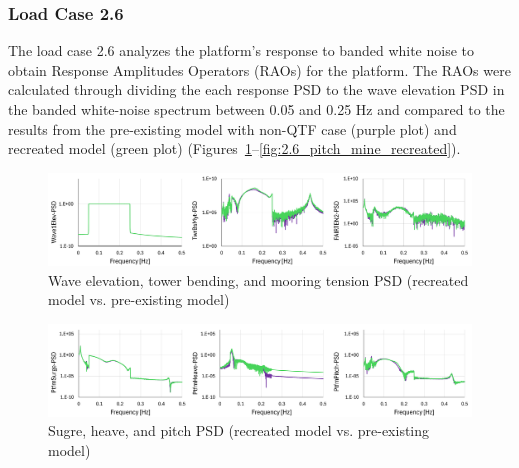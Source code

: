 \documentclass[a4paper, 11pt]{article}
\begin{document}
\subsubsection{Load Case 2.6}

\hspace*{0.5cm}The load case 2.6 analyzes the platform's response to banded white noise to obtain Response Amplitudes Operators (RAOs) for the platform. The RAOs were calculated through dividing the each response PSD to the wave elevation PSD in the banded white-noise spectrum between 0.05 and 0.25 Hz and compared to the results from the pre-existing model with non-QTF case (purple plot) and recreated model (green plot) (Figures~\ref{fig:w_t_t_p_mine_recreated}--\ref{fig:2.6_pitch_mine_recreated}).

\begin{figure}[H]
    \centering
    \includegraphics[width=1\textwidth]{wave_twr_ten_psd_mine.png}
    \caption{\small Wave elevation, tower bending, and mooring tension PSD (recreated model vs. pre-existing model)}
    \label{fig:w_t_t_p_mine_recreated}
\end{figure}

\begin{figure}[H]
    \centering
    \includegraphics[width=1\textwidth]{sur_hea_pit_psd_mine.png}
    \caption{\small Sugre, heave, and pitch PSD (recreated model vs. pre-existing model)}
    \label{fig:s_h_p_p_mine_recreated}
\end{figure}
\end{document}
